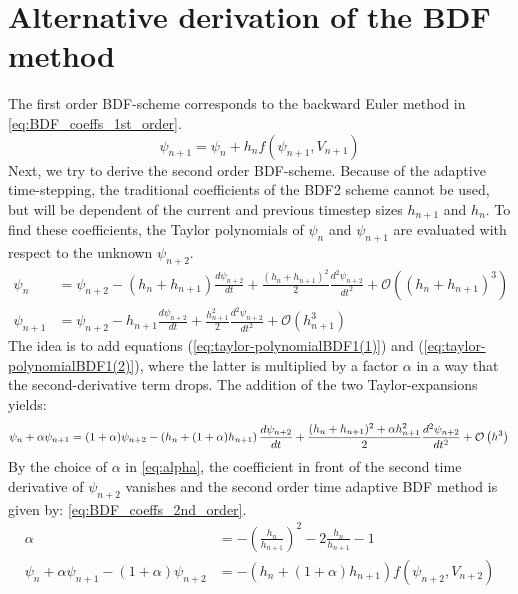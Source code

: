 \chapter{Alternative derivation of the BDF method}
\label{apx:BDF_derivation_Taylor}
The first order BDF-scheme corresponds to the backward Euler method in \autoref{eq:BDF_coeffs_1st_order}.
\begin{equation}
\label{eq:BDF_coeffs_1st_order}
\psi_{n+1} = \psi_n + h_{n}f(\psi_{n+1},V_{n+1})
\end{equation}
Next, we try to derive the second order BDF-scheme. Because of the adaptive time-stepping, the traditional coefficients of the BDF2 scheme cannot be used, but will be dependent of the current and previous timestep sizes $h_{n+1}$ and $h_n$. To find these coefficients, the Taylor polynomials of $\psi_n$ and $\psi_{n+1}$ are evaluated with respect to the unknown $\psi_{n+2}$. 
\begin{align}
\label{eq:taylor-polynomialBDF1(1)}
\psi_{n} &= \psi_{n+2} - (h_{n} + h_{n+1})\frac{d\psi_{n+2}}{dt} + \frac{(h_{n} + h_{n+1})^2}{2}\frac{d^2\psi_{n+2}}{dt^2} + \mathcal{O}\left((h_{n} + h_{n+1})^3\right) \\
\label{eq:taylor-polynomialBDF1(2)}
\psi_{n+1} &= \psi_{n+2} - h_{n+1}\frac{d\psi_{n+2}}{dt} + \frac{h_{n+1}^2}{2}\frac{d^2\psi_{n+2}}{dt^2} + \mathcal{O}\left(h_{n+1}^3\right)
\end{align}
The idea is to add equations (\ref{eq:taylor-polynomialBDF1(1)}) and (\ref{eq:taylor-polynomialBDF1(2)}), where the latter is multiplied by a factor $\alpha$ in a way that the second-derivative term drops. The addition of the two Taylor-expansions yields: 
\begin{equation}
\psi_{n} + \alpha \psi_{n+1} = (1+\alpha)\psi_{n+2} - \left(h_{n} + (1+\alpha)h_{n+1}\right)\frac{d\psi_{n+2}}{dt} + \frac{(h_{n} + h_{n+1})^2+\alpha h_{n+1}^2}{2}\frac{d^2\psi_{n+2}}{dt^2} + \mathcal{O}\left(h^3\right) \\
\end{equation}
By the choice of $\alpha$ in \autoref{eq:alpha}, the coefficient in front of the second time derivative of $\psi_{n+2}$ vanishes and the second order time adaptive BDF method is given by: \autoref{eq:BDF_coeffs_2nd_order}. 
\begin{align}
\label{eq:alpha}
\alpha &= -\left(\frac{h_n}{h_{n+1}}\right)^2 - 2\frac{h_n}{h_{n+1}} - 1 \\
\label{eq:BDF_coeffs_2nd_order}
\psi_n + \alpha \psi_{n+1} -(1+\alpha)\psi_{n+2} &= -\left(h_n + (1+\alpha)h_{n+1}\right)f(\psi_{n+2}, V_{n+2})
\end{align}
